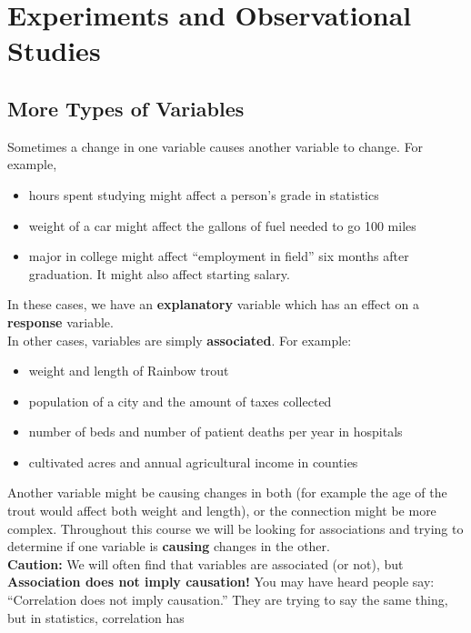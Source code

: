 \def\theTopic{Reading 8}

\section{ Experiments and Observational Studies}

\subsection{ More Types of Variables}


Sometimes a change in one variable causes another variable to change. 
For example, \vspace{-.18in}
\begin{itemize}
\item hours spent studying might affect a person's
grade in statistics
\item weight of a car might affect the gallons of fuel needed to go 100 miles
\item major in college might affect ``employment in field'' six months
  after graduation. It might also affect starting salary.
\end{itemize}
In these cases, we have an {\bf explanatory} variable which has an
effect on a  {\bf response} variable.  \\
In other cases, variables are simply {\bf associated}.  For example: \vspace{-.18in}
\begin{itemize}
\item weight and length of Rainbow trout
\item population of a city and the amount of taxes collected
\item number of beds  and  number of patient deaths per year
  in  hospitals
\item cultivated acres and annual agricultural income  in  counties
\end{itemize}
Another variable might be causing changes in both (for example the age
of the trout would affect both weight and length), or the connection might be
more complex.  Throughout this course we will be looking for
associations and trying to determine if one variable is {\bf causing}
changes in the other.  \\
{\bf Caution:} We will often find that variables are associated (or
  not), but {\bf Association does not imply causation!}   You may have
  heard people say: ``Correlation does not imply causation.''  They
  are trying to say the same thing, but in statistics, correlation has

